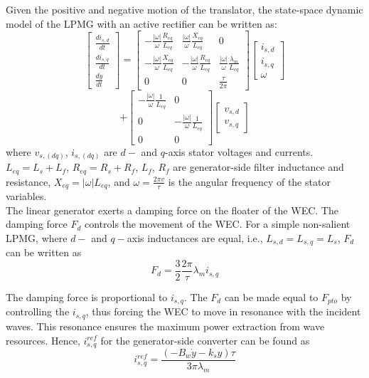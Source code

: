 \documentclass[conference]{IEEEtran}
\begin{document}
Given the positive and negative motion of the translator, the state-space dynamic model of the LPMG with an active rectifier can be written as:
\begin{equation}
\begin{bmatrix}
\frac{di_{s,d}}{dt} \\
\frac{di_{s,q}}{dt} \\
\frac{dy}{dt}
\end{bmatrix}
=
\begin{bmatrix}
-\frac{| \omega |}{\omega} \frac{R_{eq}}{L_{eq}} & \frac{| \omega |}{\omega} \frac{X_{eq}}{L_{eq}} & 0 \\
-\frac{| \omega |}{\omega} \frac{X_{eq}}{L_{eq}} & -\frac{| \omega |}{\omega} \frac{R_{eq}}{L_{eq}} & \frac{| \omega |}{\omega} \frac{\lambda_m}{L_{eq}} \\
0 & 0 & \frac{\tau}{2\pi}
\end{bmatrix}
\begin{bmatrix}
i_{s,d} \\
i_{s,q} \\
\omega
\end{bmatrix}
\end{equation}
\[
+
\begin{bmatrix}
-\frac{| \omega |}{\omega} \frac{1}{L_{eq}} & 0 \\
0 & -\frac{| \omega |}{\omega} \frac{1}{L_{eq}} \\
0 & 0
\end{bmatrix}
\begin{bmatrix}
v_{s,d} \\
v_{s,q}
\end{bmatrix}
\]
where $v_{s,(dq)}$, $i_{s,(dq)}$ are $d-$ and $q$-axis stator voltages and currents. $L_{eq} = L_s + L_f$, $R_{eq} = R_s + R_f$, $L_f$, $R_f$ are generator-side filter inductance and resistance, $X_{eq} = |\omega| L_{eq}$, and $\omega = \frac{2\pi v}{\tau}$ is the angular frequency of the stator variables.\\

The linear generator exerts a damping force on the floater of the WEC. The damping force $F_d$ controls the movement of the WEC. For a simple non-salient LPMG, where $d-$ and $q-$axis inductances are equal, i.e., $L_{s,d} = L_{s,q} = L_s$, $F_d$ can be written as
\begin{equation}
F_d = \frac{3}{2} \frac{2\pi}{\tau} \lambda_m i_{s,q}
\end{equation}

The damping force is proportional to $i_{s,q}$. The $F_d$ can be made equal to $F_{pto}$ by controlling the $i_{s,q}$, thus forcing the WEC to move in resonance with the incident waves. This resonance ensures the maximum power extraction from wave resources. Hence, $i_{s,q}^{ref}$ for the generator-side converter can be found as
\begin{equation}
i_{s,q}^{ref} = \frac{(-B_w \dot{y} - k_s y) \tau}{3\pi \lambda_m}
\end{equation}
\end{document}
